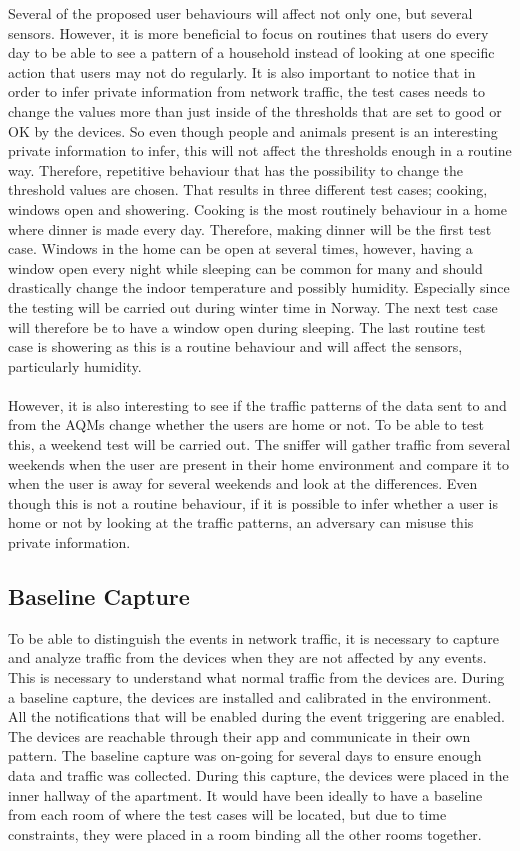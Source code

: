 Several of the proposed user behaviours will affect not only one, but several sensors. However, it is more beneficial to focus on routines that users do every day to be able to see a pattern of a household instead of looking at one specific action that users may not do regularly. It is also important to notice that in order to infer private information from network traffic, the test cases needs to change the values more than just inside of the thresholds that are set to good or OK by the devices. So even though people and animals present is an interesting private information to infer, this will not affect the thresholds enough in a routine way. Therefore, repetitive behaviour that has the possibility to change the threshold values are chosen. That results in three different test cases; cooking, windows open and showering. Cooking is the most routinely behaviour in a home where dinner is made every day. Therefore, making dinner will be the first test case. Windows in the home can be open at several times, however, having a window open every night while sleeping can be common for many and should drastically change the indoor temperature and possibly humidity. Especially since the testing will be carried out during winter time in Norway. The next test case will therefore be to have a window open during sleeping. The last routine test case is showering as this is a routine behaviour and will affect the sensors, particularly humidity. 
\\\\
However, it is also interesting to see if the traffic patterns of the data sent to and from the AQMs change whether the users are home or not. To be able to test this, a weekend test will be carried out. The sniffer will gather traffic from several weekends when the user are present in their home environment and compare it to when the user is away for several weekends and look at the differences. Even though this is not a routine behaviour, if it is possible to infer whether a user is home or not by looking at the traffic patterns, an adversary can misuse this private information. 

\subsection{Baseline Capture}
To be able to distinguish the events in network traffic, it is necessary to capture and analyze traffic from the devices when they are not affected by any events. This is necessary to understand what normal traffic from the devices are. During a baseline capture, the devices are installed and calibrated in the environment. All the notifications that will be enabled during the event triggering are enabled. The devices are reachable through their app and communicate in their own pattern. The baseline capture was on-going for several days to ensure enough data and traffic was collected. During this capture, the devices were placed in the inner hallway of the apartment. It would have been ideally to have a baseline from each room of where the test cases will be located, but due to time constraints, they were placed in a room binding all the other rooms together. 

